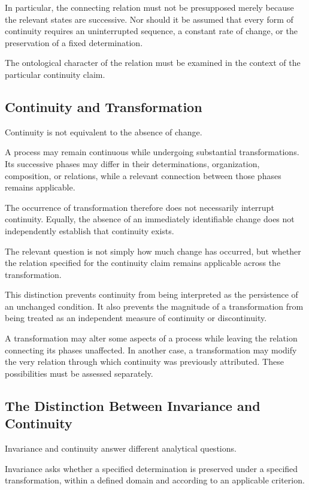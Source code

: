 In particular, the connecting relation must not
be presupposed merely because the relevant states
are successive. Nor should it be assumed that every
form of continuity requires an uninterrupted sequence,
a constant rate of change, or the preservation of
a fixed determination.

The ontological character of the relation must be
examined in the context of the particular continuity
claim.

\subsection{Continuity and Transformation}

Continuity is not equivalent to the absence of change.

A process may remain continuous while undergoing
substantial transformations. Its successive phases
may differ in their determinations, organization,
composition, or relations, while a relevant connection
between those phases remains applicable.

The occurrence of transformation therefore does
not necessarily interrupt continuity. Equally,
the absence of an immediately identifiable change
does not independently establish that continuity
exists.

The relevant question is not simply how much change
has occurred, but whether the relation specified
for the continuity claim remains applicable across
the transformation.

This distinction prevents continuity from being
interpreted as the persistence of an unchanged
condition. It also prevents the magnitude of a
transformation from being treated as an independent
measure of continuity or discontinuity.

A transformation may alter some aspects of a process
while leaving the relation connecting its phases
unaffected. In another case, a transformation may
modify the very relation through which continuity
was previously attributed. These possibilities
must be assessed separately.

\subsection{The Distinction Between Invariance and Continuity}

Invariance and continuity answer different analytical
questions.

Invariance asks whether a specified determination
is preserved under a specified transformation,
within a defined domain and according to an
applicable criterion.

